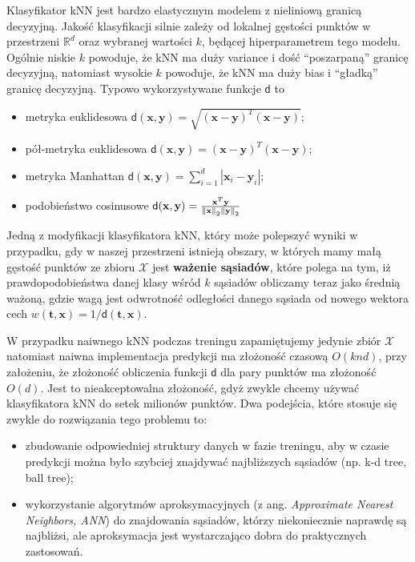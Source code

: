 \documentclass{myclass}
\numberwithin{equation}{section}
\begin{document}
Klasyfikator kNN jest bardzo elastycznym modelem z nieliniową granicą decyzyjną. Jakość klasyfikacji
silnie zależy od lokalnej gęstości punktów w przestrzeni \(\mathbb{R}^d\) oraz wybranej wartości
\(k\), będącej hiperparametrem tego modelu. Ogólnie niskie \(k\) powoduje, że kNN ma duży variance i
dość \enquote{poszarpaną} granicę decyzyjną, natomiast wysokie \(k\) powoduje, że kNN ma duży bias i
\enquote{gładką} granicę decyzyjną. Typowo wykorzystywane funkcje \(\mathsf{d}\) to
\begin{itemize}

    \item metryka euklidesowa \(\mathsf{d}(\mathbf{x},\mathbf{y}) = \sqrt{(\mathbf{x} -
    \mathbf{y})^T(\mathbf{x} - \mathbf{y})}\);

    \item pół-metryka euklidesowa \(\mathsf{d}(\mathbf{x},\mathbf{y}) = (\mathbf{x} -
    \mathbf{y})^T(\mathbf{x} - \mathbf{y})\);

    \item metryka Manhattan \(\mathsf{d}(\mathbf{x}, \mathbf{y}) = \sum_{i=1}^d |\mathbf{x}_i -
    \mathbf{y}_i|\);
    
    \item podobieństwo cosinusowe \(\mathsf{d}(\mathbf{x}, \mathbf{y}) =
    \frac{\mathbf{x}^T\mathbf{y}}{\norm{\mathbf{x}}_2 \norm{\mathbf{y}}_2}\)
    
\end{itemize}

Jedną z modyfikacji klasyfikatora kNN, który może polepszyć wyniki w przypadku, gdy w naszej
przestrzeni istnieją obszary, w których mamy małą gęstość punktów ze zbioru \(\mathcal{X}\) jest
\textbf{ważenie sąsiadów}, które polega na tym, iż prawdopodobieństwa danej klasy wśród \(k\)
sąsiadów obliczamy teraz jako średnią ważoną, gdzie wagą jest odwrotność odległości danego sąsiada
od nowego wektora cech \(w(\mathbf{t}, \mathbf{x}) = 1 / \mathsf{d}(\mathbf{t}, \mathbf{x})\).

W przypadku naiwnego kNN podczas treningu zapamiętujemy jedynie zbiór \(\mathcal{X}\) natomiast
naiwna implementacja predykcji ma złożoność czasową \(O(knd)\), przy założeniu, że złożoność
obliczenia funkcji \(\mathsf{d}\) dla pary punktów ma złożoność \(O(d)\). Jest to nieakceptowalna
złożoność, gdyż zwykle chcemy używać klasyfikatora kNN do setek milionów punktów. Dwa podejścia,
które stosuje się zwykle do rozwiązania tego problemu to: 
\begin{itemize}

    \item zbudowanie odpowiedniej struktury danych w fazie treningu, aby w czasie predykcji można
    było szybciej znajdywać najbliższych sąsiadów (np. k-d tree, ball tree);

    \item wykorzystanie algorytmów aproksymacyjnych (z ang. \textit{Approximate Nearest Neighbors,
    ANN}) do znajdowania sąsiadów, którzy niekoniecznie naprawdę są najbliżsi, ale aproksymacja jest
    wystarczająco dobra do praktycznych zastosowań.

\end{itemize}
\end{document}

